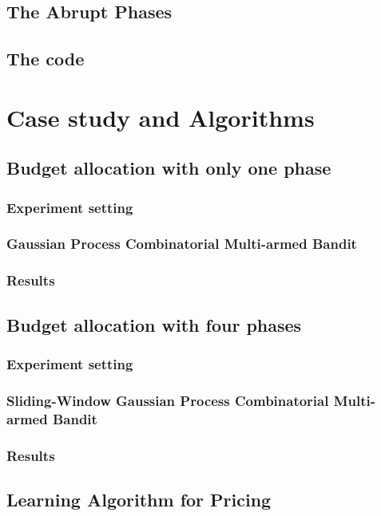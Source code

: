 \documentclass[12pt]{article}
\begin{document}
	\subsection{The Abrupt Phases}
	
	\subsection{The code}
		
	\newpage
	\section{Case study and Algorithms}
	
	\subsection{Budget allocation with only one phase}
	
	\subsubsection{Experiment setting}
	
	\subsubsection{Gaussian Process Combinatorial Multi-armed Bandit}
	
	\newpage
	\subsubsection{Results}
	
	\newpage
	\subsection{Budget allocation with four phases}
	
	\subsubsection{Experiment setting}
	
	\subsubsection{Sliding-Window Gaussian Process Combinatorial Multi-armed Bandit}
	
	\subsubsection{Results}
	
	\newpage
	\subsection{Learning Algorithm for Pricing}
	
	\newpage
\end{document}
